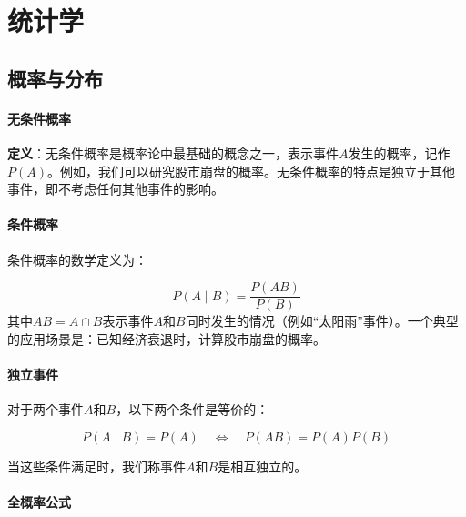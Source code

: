 \section{统计学}
	
\subsection{概率与分布}

\paragraph*{无条件概率}

\begin{flushleft}
\textbf{定义}：无条件概率是概率论中最基础的概念之一，表示事件$A$发生的概率，记作$P(A)$。例如，我们可以研究股市崩盘的概率。无条件概率的特点是独立于其他事件，即不考虑任何其他事件的影响。
\end{flushleft}
	
\paragraph*{条件概率}
\begin{flushleft}
	条件概率的数学定义为：
\end{flushleft}

\begin{equation}
	P(A\mid B)=\frac{P(AB)}{P(B)}
\end{equation}
其中$AB=A\cap B$表示事件$A$和$B$同时发生的情况（例如``太阳雨''事件）。一个典型的应用场景是：已知经济衰退时，计算股市崩盘的概率。


\paragraph*{独立事件}
\begin{flushleft}
	对于两个事件$A$和$B$，以下两个条件是等价的：
\end{flushleft}


\begin{equation}
	P(A \mid B) = P(A) \quad \Leftrightarrow \quad P(AB) = P(A)P(B)
\end{equation}

\begin{flushleft}
	当这些条件满足时，我们称事件$A$和$B$是相互独立的。
\end{flushleft}


\paragraph*{全概率公式}

